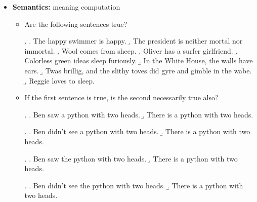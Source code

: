 \documentclass[11pt, oneside]{article}   	%
\begin{document}
\begin{itemize}
\begin{itemize}
\ex. \a. Carol loves her.
\b. Carol thinks that Michael loves her.
\c. Carol thinks that she loves Michael.
\d. She loves Carol.
\d. She thinks that Michael loves Carol.x
\d. She thinks that Carol loves Michael.

\item How does your hypothesis hold up to the following sentences?

\ex. \a. For her final act, Carol juggled five bowling pins.
\b. The terrible picture of her shocked Carol.

\newpage

\item Which of the following sentences are grammatical?

\begin{multicols}{2}{
\ex. \a. I think Craig left.
\b. I think that Craig left.
\c. Who do you think left?
\d. Who you think that left?

}\end{multicols}

\item In the following sentence, which words are most closely related to each other?

\ex. Julia mercilessly squashed the giant blue bug with her foot.

\end{itemize}
\item {\bf Semantics:} meaning computation
\begin{itemize}
\item Are the following sentences true?

\ex. \a. The happy swimmer is happy.
\b. The president is neither mortal nor immortal.
\b. Wool comes from sheep.
\b. Oliver has a surfer girlfriend.
\b. Colorless green ideas sleep furiously.
\b. In the White House, the walls have ears.
\b. Twas brillig, and the slithy toves did gyre and gimble in the wabe.
\b. Reggie loves to sleep.

\item If the first sentence is true, is the second necessarily true also?

\ex. \a. Ben saw a python with two heads.
\b. There is a python with two heads.

\ex. \a. Ben didn't see a python with two heads.
\b. There is a python with two heads.

\ex. \a. Ben saw the python with two heads.
\b. There is a python with two heads.

\ex. \a. Ben didn't see the python with two heads.
\b. There is a python with two heads.

\end{itemize}
\end{itemize}
\end{document}
